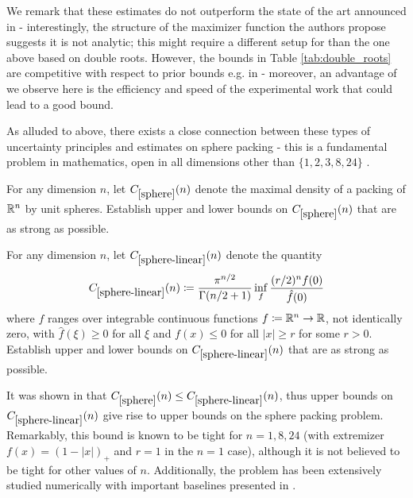 We remark that these estimates do not outperform the state of the art announced in \cite{GoncalvesSilvaRamos2023} - interestingly, the structure of the maximizer function the authors propose suggests it is not analytic; this might require a different setup for \AlphaEvolve than the one above based on double roots. However, the bounds in Table \ref{tab:double_roots} are competitive with respect to prior bounds e.g. in \cite{cohn-goncalves} - moreover, an advantage of \AlphaEvolve we observe here is the efficiency and speed of the experimental work that could lead to a good bound.

As alluded to above, there exists a close connection between these types of uncertainty principles and estimates on sphere packing - this is a fundamental problem in mathematics, open in all dimensions other than $\{1,2,3,8,24\}$ \cite{hales,viazovska,viazovska24, klartag}. 

\renewcommand{\problemURL}{https://google-deepmind.github.io/alphaevolve_repository_of_problems/problems/12.html}

\begin{problem}\label{sphere}  For any dimension $n$, let $C_{\ref{sphere}}(n)$ denote the maximal density of a packing of $\mathbb{R}^n$ by unit spheres.  Establish upper and lower bounds on $C_{\ref{sphere}}(n)$ that are as strong as possible.
\end{problem}

\renewcommand{\problemURL}{https://google-deepmind.github.io/alphaevolve_repository_of_problems/problems/13.html}

\begin{problem}\label{sphere-linear}  For any dimension $n$, let $C_{\ref{sphere-linear}}(n)$ denote the quantity
$$ C_{\ref{sphere-linear}}(n) \coloneqq \frac{\pi^{n/2}}{\Gamma(n/2+ 1)} \inf_{f} \frac{(r/2)^n f(0)}{\hat f(0)}$$
where $f$ ranges over integrable continuous functions $f \coloneqq \mathbb{R}^n \to \mathbb{R}$, not identically zero, with $\hat f(\xi) \geq 0$ for all $\xi$ and $f(x) \leq 0$ for all $|x| \geq r$ for some $r>0$. Establish upper and lower bounds on $C_{\ref{sphere-linear}}(n)$ that are as strong as possible.
\end{problem}

It was shown in \cite{cohn-elkies} that $C_{\ref{sphere}}(n) \leq C_{\ref{sphere-linear}}(n)$, thus upper bounds on $C_{\ref{sphere-linear}}(n)$ give rise to upper bounds on the sphere packing problem.  Remarkably, this bound is known to be tight for $n=1, 8, 24$ (with extremizer $f(x) = (1-|x|)_+$ and $r=1$ in the $n=1$ case), although it is not believed to be tight for other values of $n$. Additionally, the problem has been extensively studied numerically with important baselines presented in \cite{cohn-elkies}.

